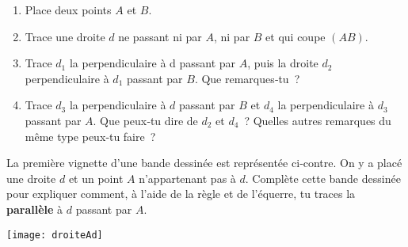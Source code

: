 
\begin{activite}

 \begin{partie}
 
  \begin{enumerate}
   \item Place deux points $A$ et $B$.
   \item Trace une droite $d$ ne passant ni par $A$, ni par $B$ et qui coupe $(AB)$.
   \item Trace $d_1$ la perpendiculaire à d passant par $A$, puis la droite $d_2$ perpendiculaire à $d_1$ passant par $B$. Que remarques‑tu ?
   \item Trace $d_3$ la perpendiculaire à $d$ passant par $B$ et $d_4$ la perpendiculaire à $d_3$ passant par $A$. Que peux‑tu dire de $d_2$ et $d_4$ ? Quelles autres remarques du même type peux‑tu faire ? 
   \end{enumerate}
   
  \end{partie} 

 \begin{partie}
 
 \begin{minipage}[c]{0.66\linewidth}
 La première vignette d'une bande dessinée est représentée ci‑contre. On y a placé une droite $d$ et un point $A$ n'appartenant pas à $d$.
 Complète cette bande dessinée pour expliquer comment, à l'aide de la règle et de l'équerre, tu traces la \textbf{parallèle} à $d$ passant par $A$.
  \end{minipage} \hfill %
 \begin{minipage}[c]{0.3\linewidth}
 \texttt{[image: droiteAd]}
  \end{minipage} \\
 
  \end{partie} 

\end{activite}


